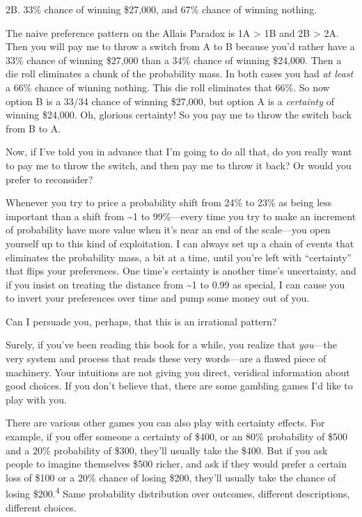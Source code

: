 {
 2B. 33\% chance of winning \$27,000, and 67\% chance of winning
nothing.}

{
 The naive preference pattern on the Allais Paradox is 1A
{\textgreater} 1B and 2B {\textgreater} 2A. Then you will pay me to
throw a switch from A to B because you'd rather have a
33\% chance of winning \$27,000 than a 34\% chance of winning \$24,000.
Then a die roll eliminates a chunk of the probability mass. In both
cases you had \textit{at least} a 66\% chance of winning nothing. This
die roll eliminates that 66\%. So now option B is a 33/34 chance of
winning \$27,000, but option A is a \textit{certainty} of winning
\$24,000. Oh, glorious certainty! So you pay me to throw the switch
back from B to A.}

{
 Now, if I've told you in advance that
I'm going to do all that, do you really want to pay me
to throw the switch, and then pay me to throw it back? Or would you
prefer to reconsider?}

{
 Whenever you try to price a probability shift from 24\% to 23\% as
being less important than a shift from \~{}1 to 99\%---every time you
try to make an increment of probability have more value when
it's near an end of the scale---you open yourself up to
this kind of exploitation. I can always set up a chain of events that
eliminates the probability mass, a bit at a time, until
you're left with
``certainty'' that flips your
preferences. One time's certainty is another
time's uncertainty, and if you insist on treating the
distance from \~{}1 to 0.99 as special, I can cause you to invert your
preferences over time and pump some money out of you.}

{
 Can I persuade you, perhaps, that this is an irrational pattern?}

{
 Surely, if you've been reading this book for a
while, you realize that \textit{you}{}---the very system and process
that reads these very words---are a flawed piece of machinery. Your
intuitions are not giving you direct, veridical information about good
choices. If you don't believe that, there are some
gambling games I'd like to play with you.}

{
 There are various other games you can also play with certainty
effects. For example, if you offer someone a certainty of \$400, or an
80\% probability of \$500 and a 20\% probability of \$300,
they'll usually take the \$400. But if you ask people
to imagine themselves \$500 richer, and ask if they would prefer a
certain loss of \$100 or a 20\% chance of losing \$200,
they'll usually take the chance of losing
\$200.\textsuperscript{4} Same probability distribution over outcomes,
different descriptions, different choices.}

